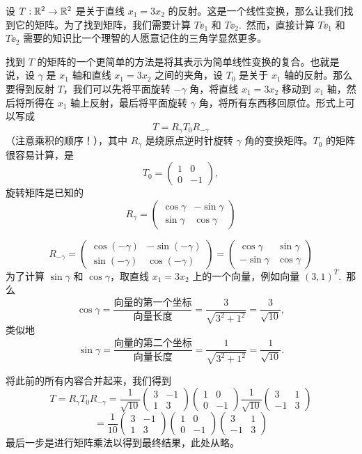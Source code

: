 \begin{example*}
设 $T: \mathbb{R}^2 \to \mathbb{R}^2$ 是关于直线 $x_1 = 3x_2$ 的反射。这是一个线性变换，那么让我们找到它的矩阵。为了找到矩阵，我们需要计算 $T \ee_1$ 和 $T \ee_2$.~然而，直接计算 $T \ee_1$ 和 $T \ee_2$ 需要的知识比一个理智的人愿意记住的三角学显然更多。

找到 $T$ 的矩阵的一个更简单的方法是将其表示为简单线性变换的复合。也就是说，设 $\gamma$ 是 $x_1$ 轴和直线 $x_1 = 3x_2$ 之间的夹角，设 $T_0$ 是关于 $x_1$ 轴的反射。那么要得到反射 $T$，我们可以先将平面旋转 $-\gamma$ 角，将直线 $x_1 = 3x_2$ 移动到 $x_1$ 轴，然后将所得在 $x_1$ 轴上反射，最后将平面旋转 $\gamma$ 角，将所有东西移回原位。形式上可以写成
$$T = R_\gamma T_0 R_{-\gamma}$$
（注意乘积的顺序！），其中 $R_\gamma$ 是绕原点逆时针旋转 $\gamma$ 角的变换矩阵。$T_0$ 的矩阵很容易计算，是
$$T_0 = \begin{pmatrix} 1 & 0 \\ 0 & -1 \end{pmatrix},$$
旋转矩阵是已知的
$$R_\gamma = \begin{pmatrix} \cos \gamma & -\sin \gamma \\ \sin \gamma & \cos \gamma \end{pmatrix}$$

$$R_{-\gamma} = \begin{pmatrix} \cos(-\gamma) & -\sin(-\gamma) \\ \sin(-\gamma) & \cos(-\gamma) \end{pmatrix} = \begin{pmatrix} \cos \gamma & \sin \gamma \\ -\sin \gamma & \cos \gamma \end{pmatrix}$$
为了计算 $\sin \gamma$ 和 $\cos \gamma$，取直线 $x_1 = 3x_2$ 上的一个向量，例如向量 $(3, 1)^T$.~那么
$$\cos \gamma = \frac{\text{向量的第一个坐标}}{\text{向量长度}} = \frac{3}{\sqrt{3^2 + 1^2}} = \frac{3}{\sqrt{10}},$$
类似地
$$\sin \gamma = \frac{\text{向量的第二个坐标}}{\text{向量长度}} = \frac{1}{\sqrt{3^2 + 1^2}} = \frac{1}{\sqrt{10}}.$$

将此前的所有内容合并起来，我们得到
$$T = R_\gamma T_0 R_{-\gamma} = \frac{1}{\sqrt{10}} \begin{pmatrix} 3 & -1 \\ 1 & 3 \end{pmatrix} \begin{pmatrix} 1 & 0 \\ 0 & -1 \end{pmatrix} \frac{1}{\sqrt{10}} \begin{pmatrix} 3 & 1 \\ -1 & 3 \end{pmatrix} $$
$$= \frac{1}{10} \begin{pmatrix} 3 & -1 \\ 1 & 3 \end{pmatrix} \begin{pmatrix} 1 & 0 \\ 0 & -1 \end{pmatrix} \begin{pmatrix} 3 & 1 \\ -1 & 3 \end{pmatrix}$$
最后一步是进行矩阵乘法以得到最终结果，此处从略。
\end{example*}

